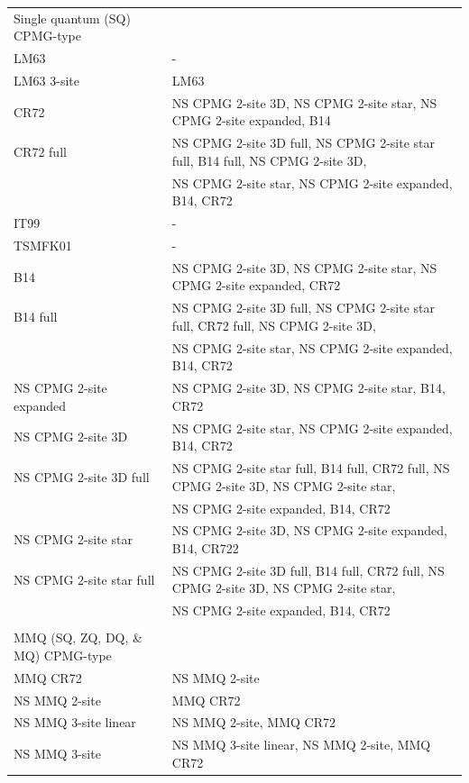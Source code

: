\begin{landscape}
\begin{center}
\begin{small}
\begin{longtable}{ll}
\\[-5pt]
Single quantum (SQ) CPMG-type \\
\cline{1-1}
LM63                             & - \\
LM63 3-site                      & LM63 \\
CR72                             & NS CPMG 2-site 3D, NS CPMG 2-site star, NS CPMG 2-site expanded, B14 \\
CR72 full                        & NS CPMG 2-site 3D full, NS CPMG 2-site star full, B14 full, NS CPMG 2-site 3D, \\
                                 & NS CPMG 2-site star, NS CPMG 2-site expanded, B14, CR72 \\
IT99                             & - \\
TSMFK01                          & - \\
B14                              & NS CPMG 2-site 3D, NS CPMG 2-site star, NS CPMG 2-site expanded, CR72 \\
B14 full                         & NS CPMG 2-site 3D full, NS CPMG 2-site star full, CR72 full, NS CPMG 2-site 3D, \\
                                 & NS CPMG 2-site star, NS CPMG 2-site expanded, B14, CR72 \\
NS CPMG 2-site expanded          & NS CPMG 2-site 3D, NS CPMG 2-site star, B14, CR72 \\
NS CPMG 2-site 3D                & NS CPMG 2-site star, NS CPMG 2-site expanded, B14, CR72 \\
NS CPMG 2-site 3D full           & NS CPMG 2-site star full, B14 full, CR72 full, NS CPMG 2-site 3D, NS CPMG 2-site star, \\
                                 & NS CPMG 2-site expanded, B14, CR72 \\
NS CPMG 2-site star              & NS CPMG 2-site 3D, NS CPMG 2-site expanded, B14, CR722 \\
NS CPMG 2-site star full         & NS CPMG 2-site 3D full, B14 full, CR72 full, NS CPMG 2-site 3D, NS CPMG 2-site star, \\
                                 & NS CPMG 2-site expanded, B14, CR72 \\

\\[-5pt]
MMQ (SQ, ZQ, DQ, \& MQ) CPMG-type \\
\cline{1-1}
MMQ CR72                         & NS MMQ 2-site \\
NS MMQ 2-site                    & MMQ CR72 \\
NS MMQ 3-site linear             & NS MMQ 2-site, MMQ CR72 \\
NS MMQ 3-site                    & NS MMQ 3-site linear, NS MMQ 2-site, MMQ CR72 \\


\end{longtable}
\end{small}
\end{center}
\end{landscape}
